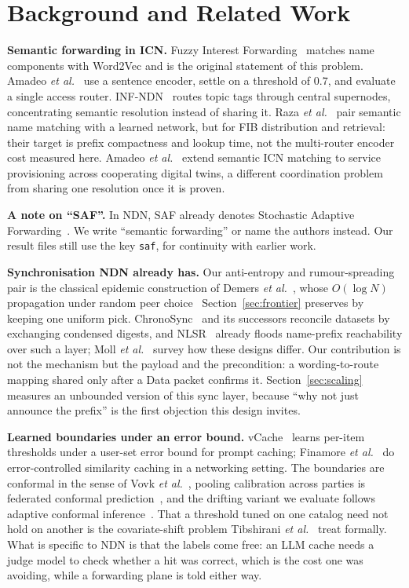 \documentclass[conference,a4paper]{IEEEtran}
\begin{document}
\section{Background and Related Work}
\label{sec:related}

\textbf{Semantic forwarding in ICN.} Fuzzy Interest
Forwarding~\cite{chan2017fuzzy} matches name components with Word2Vec and is
the original statement of this problem. Amadeo \emph{et
al.}~\cite{amadeo2026} use a sentence encoder, settle on a threshold of
$0.7$, and evaluate a single access router. INF-NDN~\cite{raza2024infndn}
routes topic tags through central supernodes, concentrating semantic
resolution instead of sharing it. Raza \emph{et al.}~\cite{raza2025smartnets}
pair semantic name matching with a learned network, but for FIB distribution
and retrieval: their target is prefix compactness and lookup time, not the
multi-router encoder cost measured here. Amadeo \emph{et
al.}~\cite{amadeo2026dtn} extend semantic ICN matching to service
provisioning across cooperating digital twins, a different coordination
problem from sharing one resolution once it is proven.

\textbf{A note on ``SAF''.} In NDN, SAF already denotes Stochastic Adaptive
Forwarding~\cite{posch2017saf}. We write ``semantic forwarding'' or name the
authors instead. Our result files still use the key \texttt{saf}, for
continuity with earlier work.

\textbf{Synchronisation NDN already has.} Our anti-entropy and
rumour-spreading pair is the classical epidemic construction of Demers
\emph{et al.}~\cite{demers1987epidemic}, whose $O(\log N)$ propagation under
random peer choice~\cite{karp2000rumor} Section~\ref{sec:frontier} preserves
by keeping one uniform pick. ChronoSync~\cite{zhu2013chronosync} and its
successors reconcile datasets by exchanging condensed digests, and
NLSR~\cite{hoque2013nlsr} already floods name-prefix reachability over such a
layer; Moll \emph{et al.}~\cite{moll2022sok} survey how these designs differ.
Our contribution is not the mechanism but the payload and the precondition: a
wording-to-route mapping shared only after a Data packet confirms it.
Section~\ref{sec:scaling} measures an unbounded version of this sync layer,
because ``why not just announce the prefix'' is the first objection this
design invites.

\textbf{Learned boundaries under an error bound.}
vCache~\cite{schroeder2025vcache} learns per-item thresholds under a user-set
error bound for prompt caching; Finamore \emph{et
al.}~\cite{finamore2022approximatekey} do error-controlled similarity caching
in a networking setting. The boundaries are conformal in the sense of Vovk
\emph{et al.}~\cite{vovk2005alrw}, pooling calibration across parties is
federated conformal prediction~\cite{lu2023federated}, and the drifting
variant we evaluate follows adaptive conformal
inference~\cite{gibbs2021aci}. That a threshold tuned on one catalog need not
hold on another is the covariate-shift problem Tibshirani \emph{et
al.}~\cite{tibshirani2019covariate} treat formally. What is specific to NDN
is that the labels come free: an LLM cache needs a judge model to check
whether a hit was correct, which is the cost one was avoiding, while a
forwarding plane is told either way.
\end{document}
